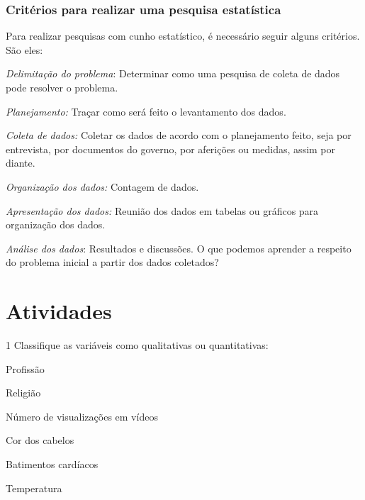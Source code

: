 {\subsubsection{Critérios para realizar uma pesquisa estatística}

Para realizar pesquisas com cunho estatístico, é necessário seguir
alguns critérios. São eles:

\medskip \noindent \textit{Delimitação do problema}: Determinar como uma pesquisa de coleta
de dados pode resolver o problema.

\medskip \noindent \textit{Planejamento:} Traçar como será feito o levantamento dos dados.

\medskip \noindent \textit{Coleta de dados:} Coletar os dados de acordo com o planejamento
feito, seja por entrevista, por documentos do governo, por aferições ou
medidas, assim por diante.

\medskip \noindent \textit{Organização dos dados:} Contagem de dados.

\medskip \noindent \textit{Apresentação dos dados:} Reunião dos dados em tabelas ou
gráficos para organização dos dados.

\medskip \noindent \textit{Análise dos dados}: Resultados e discussões. O que podemos
aprender a respeito do problema inicial a partir dos dados coletados?
}

\section*{Atividades}

\num{1} Classifique as variáveis como qualitativas ou quantitativas:
\enlargethispage{2\baselineskip}

\begin{escolha}[itemsep=0pt]

\item Profissão \ 

\item Religião \ 

\item Número de visualizações em vídeos \ 

\item Cor dos cabelos \ 

\item Batimentos cardíacos \ 

\item Temperatura \ 

\end{escolha}

